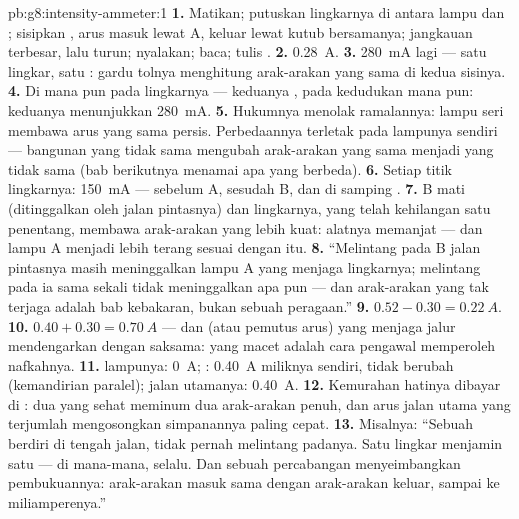 \begin{solution}{pb:g8:intensity-ammeter:1}
\textbf{1.} Matikan; putuskan lingkarnya di antara lampu dan
; sisipkan , arus masuk lewat \unit{A}, keluar
lewat kutub bersamanya; jangkauan terbesar, lalu turun; nyalakan;
baca; tulis .
\textbf{2.} \qty{0.28}{A}.
\textbf{3.} \qty{280}{mA} lagi --- satu lingkar, satu :
gardu tolnya menghitung arak-arakan yang sama di kedua sisinya.
\textbf{4.} Di mana pun pada lingkarnya --- keduanya ,
pada kedudukan mana pun: keduanya menunjukkan \qty{280}{mA}.
\textbf{5.} Hukumnya menolak ramalannya: lampu seri membawa arus yang
sama persis. Perbedaannya terletak pada lampunya sendiri --- bangunan
yang tidak sama mengubah arak-arakan yang sama menjadi  yang
tidak sama (bab berikutnya menamai apa yang berbeda).
\textbf{6.} Setiap titik lingkarnya: \qty{150}{mA} --- sebelum A,
sesudah B, dan di samping .
\textbf{7.} B mati (ditinggalkan oleh jalan pintasnya) dan lingkarnya,
yang telah kehilangan satu penentang, membawa arak-arakan yang lebih
kuat: alatnya memanjat --- dan lampu A menjadi lebih terang sesuai
dengan itu.
\textbf{8.} ``Melintang pada B jalan pintasnya masih meninggalkan
lampu A yang menjaga lingkarnya; melintang pada  ia sama
sekali tidak meninggalkan apa pun --- dan arak-arakan yang tak terjaga
adalah bab kebakaran, bukan sebuah peragaan.''
\textbf{9.} $0.52 - 0.30 = \qty{0.22}{A}$.
\textbf{10.} $0.40 + 0.30 = \qty{0.70}{A}$ --- dan  
(atau pemutus arus) yang menjaga jalur  mendengarkan dengan
saksama:  yang macet adalah cara pengawal memperoleh nafkahnya.
\textbf{11.}  lampunya: \qty{0}{A};  :
\qty{0.40}{A} miliknya sendiri, tidak berubah (kemandirian paralel);
jalan utamanya: \qty{0.40}{A}.
\textbf{12.} Kemurahan hatinya dibayar di : dua  yang
sehat meminum dua arak-arakan penuh, dan arus jalan utama yang
terjumlah mengosongkan simpanannya paling cepat.
\textbf{13.} Misalnya: ``Sebuah  berdiri di tengah jalan,
tidak pernah melintang padanya. Satu lingkar menjamin satu 
--- di mana-mana, selalu. Dan sebuah percabangan menyeimbangkan
pembukuannya: arak-arakan masuk sama dengan arak-arakan keluar, sampai
ke miliamperenya.''
\end{solution}
